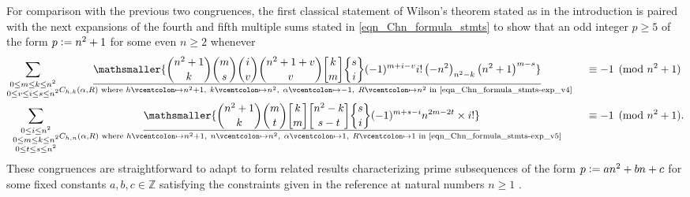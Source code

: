 \documentclass[12pt,reqno]{article}
\numberwithin{sfootnote}{section}
\numberwithin{equation}{section}
\theoremstyle{plain}
\theoremstyle{definition}
\theoremstyle{remark}
\newcommand{\defequals}{\ensuremath{\vcentcolon=}}
\newcommand{\defmapsto}{\ensuremath{\vcentcolon\mapsto}}
\newcommand{\gkpSI}[2]{\ensuremath{\genfrac{\lbrack}{\rbrack}{0pt}{}{#1}{#2}}}
\newcommand{\gkpSII}[2]{\ensuremath{\genfrac{\{}{\}}{0pt}{}{#1}{#2}}}
\newcommand{\Pochhammer}[2]{\ensuremath{\left(#1\right)_{#2}}}
\begin{document}
For comparison with the previous two congruences, the 
first classical statement of Wilson's theorem 
stated as in the introduction is paired 
with the next expansions of the fourth and fifth multiple sums stated in 
\eqref{eqn_Chn_formula_stmts} 
to show that an odd integer $p \geq 5$ of the form 
$p \defequals n^2+1$ for some even $n \geq 2$ whenever 
\begin{align*} 
\sum\limits_{\substack{0 \leq m \leq k \leq n^2 \\ 
             0 \leq v \leq i \leq s \leq n^2} 
             } & 
     \underset{C_{h,k}(\alpha, R) \text{ where } 
          h \defmapsto n^2+1,\ k \defmapsto n^2,\ 
          \alpha \defmapsto -1,\ R \defmapsto n^2 
          \text{ in \eqref{eqn_Chn_formula_stmts-exp_v4} }}{\underline{ 
     \mathsmaller{
     \binom{n^2+1}{k} \binom{m}{s} \binom{i}{v} \binom{n^2+1+v}{v} 
     \gkpSI{k}{m} \gkpSII{s}{i} (-1)^{m+i-v} i! \Pochhammer{-n^2}{n^2-k} 
     \left(n^2 + 1\right)^{m-s}}}} 
     && \equiv -1 \pmod{n^2+1} \\ 
\sum\limits_{\substack{0 \leq i \leq n^2 \\ 
                       0 \leq m \leq k \leq n^2 \\ 
                       0 \leq t \leq s \leq n^2} 
                 } & 
     \underset{C_{h,n}(\alpha, R) \text{ where } 
          h \defmapsto n^2+1,\  n \defmapsto n^2,\ 
          \alpha \defmapsto 1,\ R \defmapsto 1 
          \text{ in \eqref{eqn_Chn_formula_stmts-exp_v5} }}{\underline{ 
     \mathsmaller{
     \binom{n^2+1}{k} \binom{m}{t} \gkpSI{k}{m} 
     \gkpSI{n^2-k}{s-t} \gkpSII{s}{i} 
     (-1)^{m+s-i} n^{2m-2t} 
     \times i! 
     }} 
     } 
     && \equiv -1 \pmod{n^2+1}. 
\end{align*} 
These congruences are straightforward to adapt to 
form related results characterizing prime subsequences of the form 
$p \defequals an^2+bn+c$ for some fixed constants 
$a,b,c \in \mathbb{Z}$ satisfying the constraints given in the 
reference at natural numbers $n \geq 1$ 
\citep[\S 2.8]{HARDYWRIGHTNUMT}. 
\end{document}

